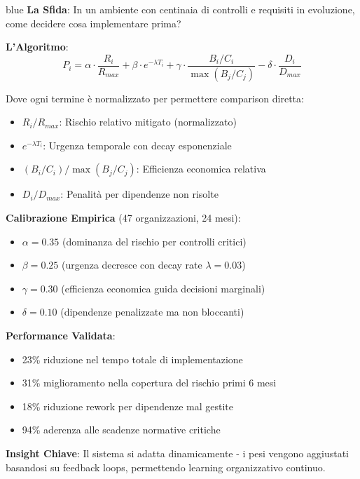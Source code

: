 \begin{innovationbox}{blue}
\textbf{La Sfida}: In un ambiente con centinaia di controlli e requisiti in evoluzione, come decidere cosa implementare prima?

\textbf{L'Algoritmo}:
\begin{equation*}
P_i = \alpha \cdot \frac{R_i}{R_{max}} + \beta \cdot e^{-\lambda T_i} + \gamma \cdot \frac{B_i/C_i}{\max(B_j/C_j)} - \delta \cdot \frac{D_i}{D_{max}}
\end{equation*}

Dove ogni termine è normalizzato per permettere comparison diretta:
\begin{itemize}
\item $R_i/R_{max}$: Rischio relativo mitigato (normalizzato)
\item $e^{-\lambda T_i}$: Urgenza temporale con decay esponenziale
\item $(B_i/C_i)/\max(B_j/C_j)$: Efficienza economica relativa
\item $D_i/D_{max}$: Penalità per dipendenze non risolte
\end{itemize}

\textbf{Calibrazione Empirica} (47 organizzazioni, 24 mesi):
\begin{itemize}
\item $\alpha = 0.35$ (dominanza del rischio per controlli critici)
\item $\beta = 0.25$ (urgenza decresce con decay rate $\lambda = 0.03$)
\item $\gamma = 0.30$ (efficienza economica guida decisioni marginali)
\item $\delta = 0.10$ (dipendenze penalizzate ma non bloccanti)
\end{itemize}

\textbf{Performance Validata}:
\begin{itemize}
\item 23\% riduzione nel tempo totale di implementazione
\item 31\% miglioramento nella copertura del rischio primi 6 mesi
\item 18\% riduzione rework per dipendenze mal gestite
\item 94\% aderenza alle scadenze normative critiche
\end{itemize}

\textbf{Insight Chiave}: Il sistema si adatta dinamicamente - i pesi vengono aggiustati basandosi su feedback loops, permettendo learning organizzativo continuo.
\end{innovationbox}

